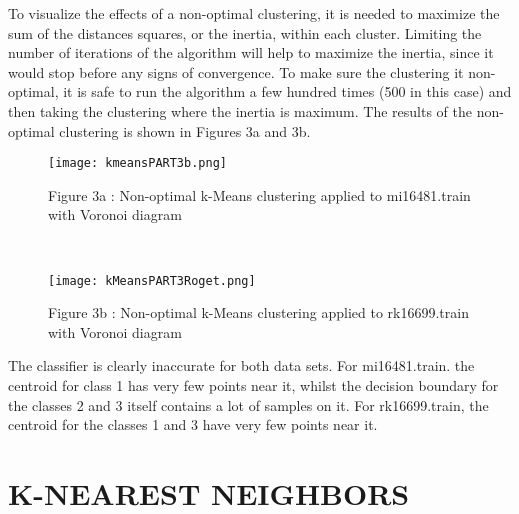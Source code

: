                       To visualize the effects of a non-optimal clustering, it is needed to maximize the sum of the distances squares, or the inertia, within each cluster. Limiting the number of iterations of the algorithm will help to maximize the inertia, since it would stop before any signs of convergence. To make sure the clustering it non-optimal, it is safe to run the algorithm a few hundred times (500 in this case) and then taking the clustering where the inertia is maximum. The
                      results of the non-optimal clustering is shown in Figures 3a and 3b.
                      \\
                      \begin{wrapfigure}{}{\textwidth}
                        \begin{center}
                            \texttt{[image: kmeansPART3b.png]}
                                \caption{Figure 3a : Non-optimal k-Means clustering applied to mi16481.train with Voronoi diagram}
                                 \end{center}
                                 \end{wrapfigure}
                                 \\
                                 \begin{wrapfigure}{}{\textwidth}
                                   \begin{center}
                                       \texttt{[image: kMeansPART3Roget.png]}
                                           \caption{Figure 3b : Non-optimal k-Means clustering applied to rk16699.train with Voronoi diagram}
                                            \end{center}
                                            \end{wrapfigure}


                                            The classifier is clearly inaccurate for both data sets. For mi16481.train. the centroid for class 1 has very few points near it, whilst the decision boundary for the classes 2 and 3 itself contains a lot of samples on it. For rk16699.train, the centroid for the classes 1 and 3 have very few points near it.

                                            \section{\label{sec:level4}K-NEAREST NEIGHBORS}


